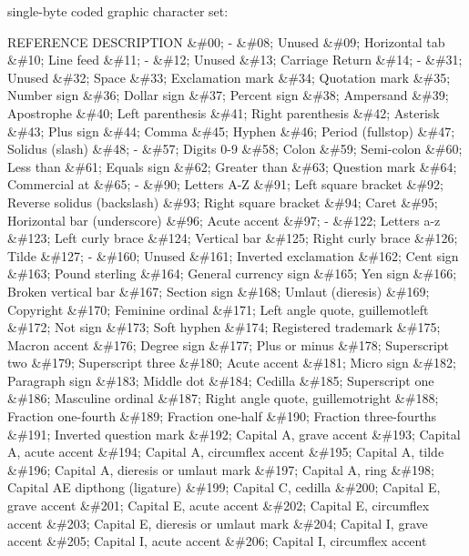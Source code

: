 single-byte coded graphic character set:
\par REFERENCE       DESCRIPTION
\&\#00; - \&\#08;   Unused
\&\#09;     Horizontal tab
\&\#10;     Line feed
\&\#11; - \&\#12;   Unused
\&\#13;     Carriage Return
\&\#14; - \&\#31;   Unused
\&\#32;     Space
\&\#33;     Exclamation mark
\&\#34;     Quotation mark
\&\#35;     Number sign
\&\#36;     Dollar sign
\&\#37;     Percent sign
\&\#38;     Ampersand
\&\#39;     Apostrophe
\&\#40;     Left parenthesis
\&\#41;     Right parenthesis
\&\#42;     Asterisk
\&\#43;     Plus sign
\&\#44;     Comma
\&\#45;     Hyphen
\&\#46;     Period (fullstop)
\&\#47;     Solidus (slash)
\&\#48; - \&\#57;   Digits 0-9
\&\#58;     Colon
\&\#59;     Semi-colon
\&\#60;     Less than
\&\#61;     Equals sign
\&\#62;     Greater than
\&\#63;     Question mark
\&\#64;     Commercial at
\&\#65; - \&\#90;   Letters A-Z
\&\#91;     Left square bracket
\&\#92;     Reverse solidus (backslash)
\&\#93;     Right square bracket
\&\#94;     Caret
\&\#95;     Horizontal bar (underscore)
\&\#96;     Acute accent
\&\#97; - \&\#122;  Letters a-z
\&\#123;   Left curly brace
\&\#124;   Vertical bar
\&\#125;   Right curly brace
\&\#126;   Tilde
\&\#127; - \&\#160; Unused
\&\#161;   Inverted exclamation
\&\#162;   Cent sign
\&\#163;   Pound sterling
\&\#164;   General currency sign
\&\#165;   Yen sign
\&\#166;   Broken vertical bar
\&\#167;   Section sign
\&\#168;   Umlaut (dieresis)
\&\#169;   Copyright
\&\#170;   Feminine ordinal
\&\#171;   Left angle quote, guillemotleft
\&\#172;   Not sign
\&\#173;   Soft hyphen
\&\#174;   Registered trademark
\&\#175;   Macron accent
\&\#176;   Degree sign
\&\#177;   Plus or minus
\&\#178;   Superscript two
\&\#179;   Superscript three
\&\#180;   Acute accent
\&\#181;   Micro sign
\&\#182;   Paragraph sign
\&\#183;   Middle dot
\&\#184;   Cedilla
\&\#185;   Superscript one
\&\#186;   Masculine ordinal
\&\#187;   Right angle quote, guillemotright
\&\#188;   Fraction one-fourth
\&\#189;   Fraction one-half
\&\#190;   Fraction three-fourths
\&\#191;   Inverted question mark
\&\#192;   Capital A, grave accent
\&\#193;   Capital A, acute accent
\&\#194;   Capital A, circumflex accent
\&\#195;   Capital A, tilde
\&\#196;   Capital A, dieresis or umlaut mark
\&\#197;   Capital A, ring
\&\#198;   Capital AE dipthong (ligature)
\&\#199;   Capital C, cedilla
\&\#200;   Capital E, grave accent
\&\#201;   Capital E, acute accent
\&\#202;   Capital E, circumflex accent
\&\#203;   Capital E, dieresis or umlaut mark
\&\#204;   Capital I, grave accent
\&\#205;   Capital I, acute accent
\&\#206;   Capital I, circumflex accent
